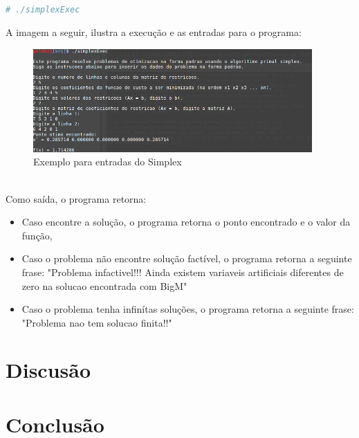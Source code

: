 \documentclass[a4paper]{article}
\begin{document}
\\
\begin{lstlisting}[language=bash]
  # ./simplexExec 
\end{lstlisting}
A imagem a seguir, ilustra a execu\c{c}\~ao e as entradas para o programa:
\begin{figure}[h]
\caption{Exemplo para entradas do Simplex}
\includegraphics[width=0.95\textwidth]{simplexEntradas.png}
\end{figure}
\\
Como sa\'ida, o programa retorna:
\begin{itemize}
\item Caso encontre a solu\c{c}\~ao, o programa retorna o ponto encontrado e o valor da fun\c{c}\~ao,
\item Caso o problema n\~ao encontre solu\c{c}\~ao fact\'ivel, o programa retorna a seguinte frase: "Problema infactivel!!! Ainda existem variaveis artificiais diferentes de zero na solucao encontrada com BigM"
\\
\item Caso o problema tenha infin\'itas solu\c{c}\~oes, o programa retorna a seguinte frase: "Problema nao tem solucao finita!!"
\end{itemize}
\section{Discus\~ao}
\section{Conclus\~ao}
\end{document}
